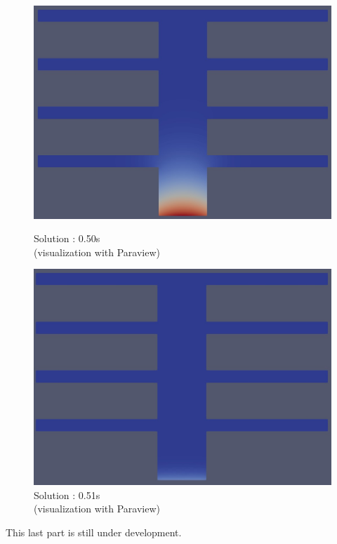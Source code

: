 \begin{figure}[H]
	\centering
	\begin{minipage}{0.48\linewidth}
		\includegraphics[width=0.7\linewidth]{"images/parareal/feelpp/heat_0.50.jpg"}
		\caption{Solution : 0.50s \\ (visualization with Paraview)}
	\end{minipage}
	\begin{minipage}{0.48\linewidth}
		\includegraphics[width=0.7\linewidth]{"images/parareal/feelpp/heat_0.51.jpg"}
		\caption{Solution : 0.51s \\ (visualization with Paraview)}
	\end{minipage}	
\end{figure}
This last part is still under development.